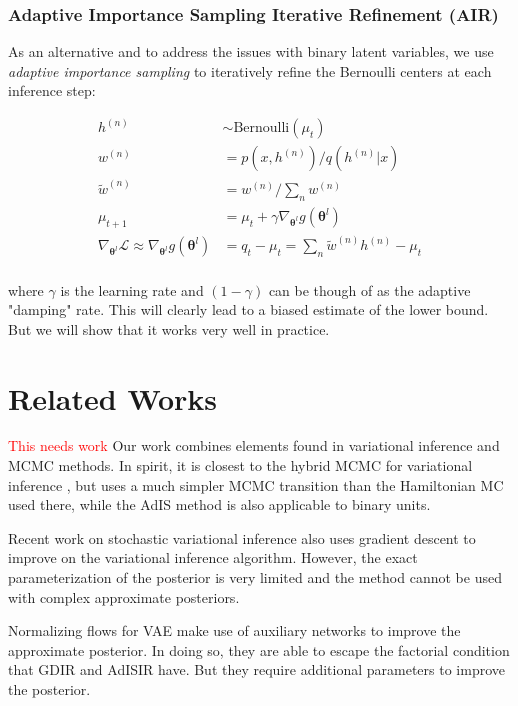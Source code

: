 \documentclass{article} %
\newcommand{\vects}[1]{\boldsymbol{#1}}
\newcommand{\TT}[0]{\vects{\theta}}
\newcommand{\grad}[0]{\nabla}
\newcommand{\alert}[1]{\textcolor{red}{#1}}
\newcommand{\LL}[0]{\mathcal{L}}
\newcommand{\Bernoulli}{\text{Bernoulli}}
\begin{document}
\subsubsection{Adaptive Importance Sampling Iterative Refinement (AIR)}
As an alternative and to address the issues with binary latent variables, we use \emph{adaptive importance sampling} \citep{karamchandani1989adaptive} to iteratively refine the Bernoulli centers at each inference step:

\begin{align}
    h^{(n)} &\sim \Bernoulli(\mu_t) \nonumber \\
w^{(n)} &= p(x, h^{(n)}) / q(h^{(n)} | x) \nonumber \\
\tilde{w}^{(n)} &= w^{(n)} / \sum_n w^{(n)} \nonumber \\
\mu_{t+1} &= \mu_t + \gamma \grad_{\TT^l} g(\TT^l) \nonumber\\
\grad_{\TT^l} \LL \approx \grad_{\TT^l} g(\TT^l) &= q_t - \mu_t  = \sum_n \tilde{w}^{(n)} h^{(n)} - \mu_t \\
\end{align}

where $\gamma$ is the learning rate and $(1 - \gamma)$ can be though of as the adaptive "damping" rate. This will clearly lead to a biased estimate of the lower bound. But we will show that it works very well in practice.

\section{Related Works}
\alert{This needs work}
Our work combines elements found in variational inference and MCMC methods. In spirit, it is closest to the hybrid MCMC for variational inference \citep{salimans2014markov}, but uses a much simpler MCMC transition than the Hamiltonian MC used there, while the AdIS method is also applicable to binary units.

Recent work on stochastic variational inference \cite{hoffman2013stochastic} also uses gradient descent to improve on the variational inference algorithm. However, the exact parameterization of the posterior is very limited and the method cannot be used with complex approximate posteriors. 

Normalizing flows for VAE \citep{rezende2015variational} make use of auxiliary networks to improve the approximate posterior. In doing so, they are able to escape the factorial condition that GDIR and AdISIR have. But they require additional parameters to improve the posterior.
\end{document}
